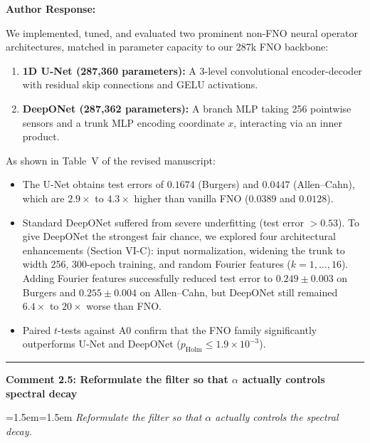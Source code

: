 \documentclass[11pt,a4paper]{article}
\newcommand{\revcomment}[2]{%
  \vspace{3mm}\par\noindent
  \textbf{\color{navyblue}#1}\par\vspace{1.5mm}
  \begingroup
  \leftskip=1.5em\rightskip=1.5em
  \small\itshape\color{commentgray}
  #2\par
  \endgroup
  \vspace{2mm}
}
\newenvironment{authorresponse}{%
  \vspace{1mm}\par\noindent
  \textbf{\color{navyblue}Author Response:}\par\vspace{1.5mm}
}{%
  \vspace{3mm}\par\noindent\rule{\textwidth}{0.3pt}\vspace{2mm}
}
\begin{document}
\begin{authorresponse}
We implemented, tuned, and evaluated two prominent non-FNO neural operator architectures, matched in parameter capacity to our 287k FNO backbone:
\begin{enumerate}
  \item \textbf{1D U-Net (287,360 parameters):} A 3-level convolutional encoder-decoder with residual skip connections and GELU activations.
  \item \textbf{DeepONet (287,362 parameters):} A branch MLP taking 256 pointwise sensors and a trunk MLP encoding coordinate $x$, interacting via an inner product.
\end{enumerate}
As shown in Table~V of the revised manuscript:
\begin{itemize}
  \item The U-Net obtains test errors of $0.1674$ (Burgers) and $0.0447$ (Allen--Cahn), which are $2.9\times$ to $4.3\times$ higher than vanilla FNO ($0.0389$ and $0.0128$).
  \item Standard DeepONet suffered from severe underfitting (test error $>0.53$). To give DeepONet the strongest fair chance, we explored four architectural enhancements (Section VI-C): input normalization, widening the trunk to width 256, 300-epoch training, and random Fourier features ($k=1,\dots,16$). Adding Fourier features successfully reduced test error to $0.249 \pm 0.003$ on Burgers and $0.255 \pm 0.004$ on Allen--Cahn, but DeepONet still remained $6.4\times$ to $20\times$ worse than FNO.
  \item Paired $t$-tests against A0 confirm that the FNO family significantly outperforms U-Net and DeepONet ($p_{\mathrm{Holm}} \le 1.9 \times 10^{-3}$).
\end{itemize}
\end{authorresponse}

\revcomment{Comment 2.5: Reformulate the filter so that $\alpha$ actually controls spectral decay}{Reformulate the filter so that $\alpha$ actually controls the spectral decay.}
\end{document}

